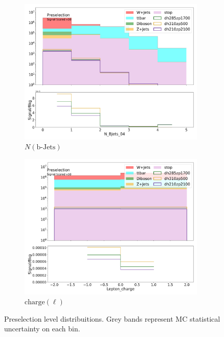 \begin{figure}[htbp]
\begin{subfigure}{0.49\textwidth}
         \includegraphics[width = 0.98\textwidth]{Figures/appendix/Preselection/N_BJets_04.png}
         \caption{\ensuremath{N (\text{b-Jets})}\xspace}
         \end{subfigure}
         \begin{subfigure}{0.49\textwidth}
         \includegraphics[width = 0.98\textwidth]{Figures/appendix/Preselection/Lepton_charge.png}
         \caption{$\text{charge}(\ell)$}
         \end{subfigure}

         \caption{Preselection level distribuitions. Grey bands represent MC statistical uncertainty on each bin.}
         \label{fig:Presel3}
      \end{figure}
\FloatBarrier

